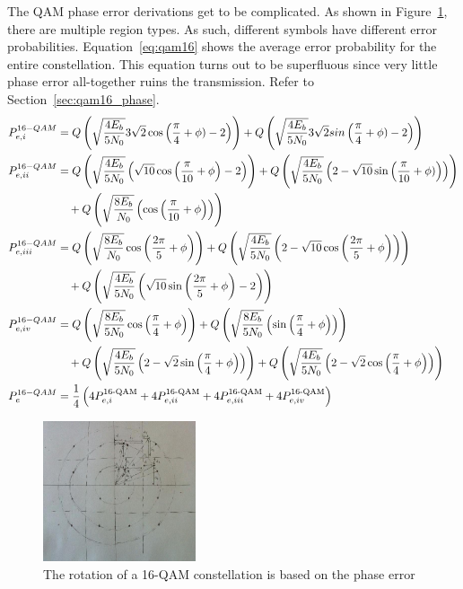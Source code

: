 \documentclass[]{article}
\newcommand{\rom}[1]{\uppercase\expandafter{\romannumeral#1}}
\begin{document}
The QAM phase error derivations get to be complicated.  As shown in Figure~\ref{fig:qamDraw}, there are multiple region types.  As such, different symbols have different error probabilities.  Equation~\ref{eq:qam16} shows the average error probability for the entire constellation.  This equation turns out to be superfluous since very little phase error all-together ruins the transmission.  Refer to Section~\ref{sec:qam16_phase}.
\begin{align}
P_{e,\rom{1}}^{16-QAM} &= Q\left(\sqrt{\frac{4E_b}{5N_0}}3\sqrt{2}\cos\left(\frac{\pi}{4}+\phi)-2\right)\right) + Q\left(\sqrt{\frac{4E_b}{5N_0}}3\sqrt{2}sin\left(\frac{\pi}{4}+\phi)-2\right)\right) \\
P_{e,\rom{2}}^{16-QAM} &= Q\left(\sqrt{\frac{4E_b}{5N_0}}\left(\sqrt{10}\cos\left(\frac{\pi}{10}+\phi\right)-2\right)\right)  +  Q\left(\sqrt{\frac{4E_b}{5N_0}}\left(2-\sqrt{10}\sin\left(\frac{\pi}{10}+\phi)\right)\right)\right) \nonumber \\
&\quad {} + Q\left(\sqrt{\frac{8E_b}{N_0}}\left(\cos\left(\frac{\pi}{10}+\phi\right)\right)\right) \\
P_{e,\rom{3}}^{16-QAM} &= Q\left(\sqrt{\frac{8E_b}{N_0}}\cos\left(\frac{2\pi}{5}+\phi\right)\right)  +  Q\left(\sqrt{\frac{4E_b}{5N_0}}\left(2-\sqrt{10}\cos\left(\frac{2\pi}{5}+\phi \right)\right)\right) \nonumber \\
&\quad {} + Q\left(\sqrt{\frac{4E_b}{5N_0}}\left(\sqrt{10}\sin\left(\frac{2\pi}{5}+\phi\right)-2\right)\right)\\
P_{e,\rom{4}}^{16-QAM} &= Q\left(\sqrt{\frac{8E_b}{5N_0}}\cos\left(\frac{\pi}{4}+\phi\right)\right)  +  Q\left(\sqrt{\frac{8E_b}{5N_0}}\left(\sin\left(\frac{\pi}{4}+\phi \right)\right)\right) \nonumber \\
&\quad {} + Q\left(\sqrt{\frac{4E_b}{5N_0}}\left(2-\sqrt{2}\sin\left(\frac{\pi}{4}+\phi\right)\right)\right) + Q\left(\sqrt{\frac{4E_b}{5N_0}}\left(2-\sqrt{2}\cos\left(\frac{\pi}{4}+\phi\right)\right)\right) \\
\label{eq:qam16}
P_{e}^{16-QAM} &= \frac{1}{4}\left( 4P_{e,\rom{1}}^{\text{16-QAM}} + 4P_{e,\rom{2}}^{\text{16-QAM}} + 4P_{e,\rom{3}}^{\text{16-QAM}} + 4P_{e,\rom{4}}^{\text{16-QAM}} \right)
\end{align}

\begin{figure}[H]
\centering
\hspace*{-2cm}\includegraphics[width=0.4\textwidth]{qamDraw.jpg}
\caption{The rotation of a 16-QAM constellation is based on the phase error \label{fig:qamDraw}}
\end{figure}
\end{document}
